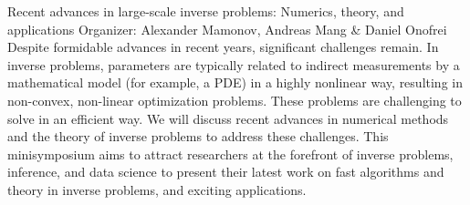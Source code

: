 \label{mini01}

\miniabs
{Recent advances in large-scale inverse problems: Numerics, theory, and applications}
{Organizer: Alexander Mamonov, Andreas Mang \& Daniel Onofrei}
{Despite formidable advances in recent years, significant challenges remain. In inverse problems, parameters are typically related to indirect measurements by a mathematical model (for example, a PDE) in a highly nonlinear way, resulting in non-convex, non-linear optimization problems. These problems are challenging to solve in an efficient way. We will discuss recent advances in numerical methods and the theory of inverse problems to address these challenges. This minisymposium aims to attract researchers at the forefront of inverse problems, inference, and data science to present their latest work on fast algorithms and theory in inverse problems, and exciting applications.}


